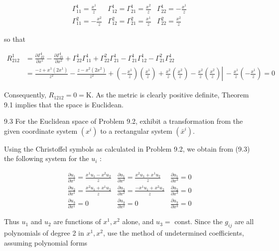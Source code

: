 \documentclass[10pt]{article}
\begin{document}
$$
\begin{array}{lll}
\Gamma_{11}^{1}=\frac{x^{1}}{z} & \Gamma_{12}^{1}=\Gamma_{21}^{1}=\frac{x^{2}}{z} & \Gamma_{22}^{1}=-\frac{x^{1}}{z} \\
\Gamma_{11}^{2}=-\frac{x^{2}}{z} & \Gamma_{12}^{2}=\Gamma_{21}^{2}=\frac{x^{1}}{z} & \Gamma_{22}^{2}=\frac{x^{2}}{z}
\end{array}
$$

so that

$$
\begin{aligned}
R_{212}^{1} & =\frac{\partial \Gamma_{22}^{1}}{\partial x^{1}}-\frac{\partial \Gamma_{21}^{1}}{\partial x^{2}}+\Gamma_{22}^{1} \Gamma_{11}^{1}+\Gamma_{22}^{2} \Gamma_{21}^{1}-\Gamma_{21}^{1} \Gamma_{12}^{1}-\Gamma_{21}^{2} \Gamma_{22}^{1} \\
& \left.=\frac{-z+x^{1}\left(2 x^{1}\right)}{z^{2}}-\frac{z-x^{2}\left(2 x^{2}\right)}{z^{2}}+\left(-\frac{x^{1}}{z}\right)\left(\frac{x^{1}}{z}\right)+\frac{x^{2}}{z}\left(\frac{x^{2}}{z}\right)-\frac{x^{2}}{z}\left(\frac{x^{2}}{z}\right) \right\rvert\,-\frac{x^{1}}{z}\left(-\frac{x^{1}}{z}\right)=0
\end{aligned}
$$

Consequently, $R_{1212}=0=\mathrm{K}$. As the metric is clearly positive definite, Theorem 9.1 implies that the space is Euclidean.

9.3 For the Euclidean space of Problem 9.2, exhibit a transformation from the given coordinate system $\left(x^{i}\right)$ to a rectangular system $\left(\bar{x}^{i}\right)$.

Using the Christoffel symbols as calculated in Problem 9.2, we obtain from (9.3) the following system for the $u_{i}$ :

\[
\begin{array}{lll}
\frac{\partial u_{1}}{\partial x^{1}}=\frac{x^{1} u_{1}-x^{2} u_{2}}{z} & \frac{\partial u_{1}}{\partial x^{2}}=\frac{x^{2} u_{1}+x^{1} u_{2}}{z} & \frac{\partial u_{1}}{\partial x^{3}}=0 \\
\frac{\partial u_{2}}{\partial x^{1}}=\frac{x^{2} u_{1}+x^{1} u_{2}}{z} & \frac{\partial u_{2}}{\partial x^{2}}=\frac{-x^{1} u_{1}+x^{2} u_{2}}{z} & \frac{\partial u_{2}}{\partial x^{3}}=0 \\
\frac{\partial u_{3}}{\partial x^{1}}=0 & \frac{\partial u_{3}}{\partial x^{2}}=0 & \frac{\partial u_{3}}{\partial x^{3}}=0 \tag{3}
\end{array}
\]

Thus $u_{1}$ and $u_{2}$ are functions of $x^{1}, x^{2}$ alone, and $u_{3}=$ const. Since the $g_{i j}$ are all polynomials of degree 2 in $x^{1}, x^{2}$, use the method of undetermined coefficients, assuming polynomial forms
\end{document}
